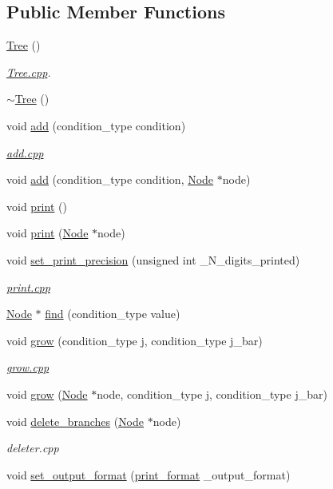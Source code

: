 \subsection*{Public Member Functions}
\begin{DoxyCompactItemize}
\item 
\hyperlink{class_tree_a32a2cac7d7a95d1d549d528cc088660c}{Tree} ()
\begin{DoxyCompactList}\small\item\em \hyperlink{_tree_8cpp}{Tree.\+cpp}. \end{DoxyCompactList}\item 
\hyperlink{class_tree_aa4d8eec83dea9da55071cdf181078119}{$\sim$\+Tree} ()
\item 
void \hyperlink{class_tree_af8292ba7cef24827af0584b31cfc33a8}{add} (condition\+\_\+type condition)
\begin{DoxyCompactList}\small\item\em \hyperlink{add_8cpp}{add.\+cpp} \end{DoxyCompactList}\item 
void \hyperlink{class_tree_a7c4512f8790d44351b07ed31491fd5e5}{add} (condition\+\_\+type condition, \hyperlink{struct_node}{Node} $\ast$node)
\item 
void \hyperlink{class_tree_ac4a139b22a1188e616efbd2919871959}{print} ()
\item 
void \hyperlink{class_tree_aeef6af51b2097d5e61335005568835d1}{print} (\hyperlink{struct_node}{Node} $\ast$node)
\item 
void \hyperlink{class_tree_a21f8cfc7ca1e7bd8fe8c33c94240449f}{set\+\_\+print\+\_\+precision} (unsigned int \+\_\+\+N\+\_\+digits\+\_\+printed)
\begin{DoxyCompactList}\small\item\em \hyperlink{print_8cpp}{print.\+cpp} \end{DoxyCompactList}\item 
\hyperlink{struct_node}{Node} $\ast$ \hyperlink{class_tree_a7ad01e2d8b572e6d1f97e0031214117a}{find} (condition\+\_\+type value)
\item 
void \hyperlink{class_tree_ab05cd263b882d58cee3c671c6ba646fd}{grow} (condition\+\_\+type j, condition\+\_\+type j\+\_\+bar)
\begin{DoxyCompactList}\small\item\em \hyperlink{grow_8cpp}{grow.\+cpp} \end{DoxyCompactList}\item 
void \hyperlink{class_tree_ab61c4fff29f3551d8f67f075213331dc}{grow} (\hyperlink{struct_node}{Node} $\ast$node, condition\+\_\+type j, condition\+\_\+type j\+\_\+bar)
\item 
void \hyperlink{class_tree_ae78f42d798cdd24b3d5b24621b939468}{delete\+\_\+branches} (\hyperlink{struct_node}{Node} $\ast$node)
\begin{DoxyCompactList}\small\item\em deleter.\+cpp \end{DoxyCompactList}\item 
void \hyperlink{class_tree_a8e176aced327c226e89a3790cb8f3d68}{set\+\_\+output\+\_\+format} (\hyperlink{_tree_8hpp_a73f5f76e6617ce240bad0b57b80be996}{print\+\_\+format} \+\_\+output\+\_\+format)
\end{DoxyCompactItemize}
